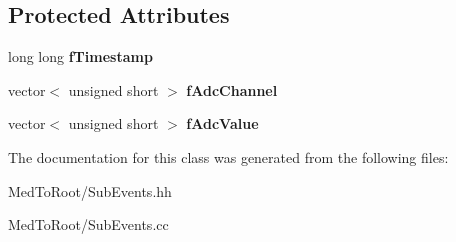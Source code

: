 \subsection*{Protected Attributes}
\begin{DoxyCompactItemize}
\item 
\mbox{\label{class_adc_sub_event_a4da7e5aa53af126234c81cbcf64cfd85}} 
long long {\bfseries f\+Timestamp}
\item 
\mbox{\label{class_adc_sub_event_a27eefd5215bc0d882b277d627c33436d}} 
vector$<$ unsigned short $>$ {\bfseries f\+Adc\+Channel}
\item 
\mbox{\label{class_adc_sub_event_a0c779d8072a161c53e3b3ac57d41a25a}} 
vector$<$ unsigned short $>$ {\bfseries f\+Adc\+Value}
\end{DoxyCompactItemize}


The documentation for this class was generated from the following files\+:\begin{DoxyCompactItemize}
\item 
Med\+To\+Root/Sub\+Events.\+hh\item 
Med\+To\+Root/Sub\+Events.\+cc\end{DoxyCompactItemize}
